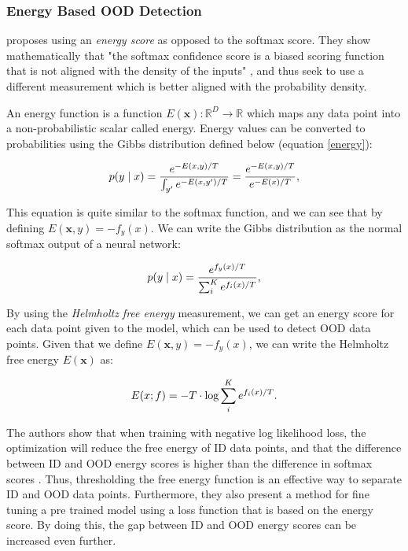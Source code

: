\documentclass[conference,onecolumn]{IEEEtran}
\begin{document}
\subsubsection{Energy Based OOD Detection}

\cite{energy} proposes using an {\it energy score} as opposed to the softmax score. They show mathematically that "the softmax confidence score is a biased scoring function that is not aligned with the density of the inputs" \cite{energy}, and thus seek to use a different measurement which is better aligned with the probability density.

An energy function is a function $E(\bm{x}) : \mathbb{R}^D \rightarrow \mathbb{R}$ which maps any data point into a non-probabilistic scalar called energy. Energy values can be converted to probabilities using the Gibbs distribution defined below (equation \ref{energy}):

\begin{equation} \label{energy}
    p(y \mid \*x) = \frac{e^{-E(\*x,y)/T}}{\int_{y'} e^{-E(\*x, y')/T}}
    = \frac{e^{-E(\*x,y)/T}}{e^{-E(\*x)/T}},
\end{equation}

This equation is quite similar to the softmax function, and we can see that by defining $E(\bm{x}, y) = -f_y(x)$. We can write the Gibbs distribution as the normal softmax output of a neural network:

\begin{equation}\label{eq:softmax}
    p(y \mid \*x) = \frac{e^{f_y(\*x)/T}}{\sum_{i}^K e^{f_{i}(\*x)/T}},
\end{equation}

By using the {\it Helmholtz free energy} measurement, we can get an energy score for each data point given to the model, which can be used to detect OOD data points. Given that we define $E(\bm{x}, y) = -f_y(x)$, we can write the Helmholtz free energy $E(\bm{x})$ as:

\begin{equation}\label{eq:energy_softmax}
  E(\*x;f)=- T\cdot \text{log}\sum_i^K e^{f_i(\*x)/T}.
\end{equation}

The authors show that when training with negative log likelihood loss, the optimization will reduce the free energy of ID data points, and that the difference  between ID and OOD energy scores is higher than the difference in softmax scores \cite{energy}. Thus, thresholding the free energy function is an effective way to separate ID and OOD data points. Furthermore, they also present a method for fine tuning a pre trained model using a loss function that is based on the energy score. By doing this, the gap between ID and OOD energy scores can be increased even further.
\\
\end{document}
